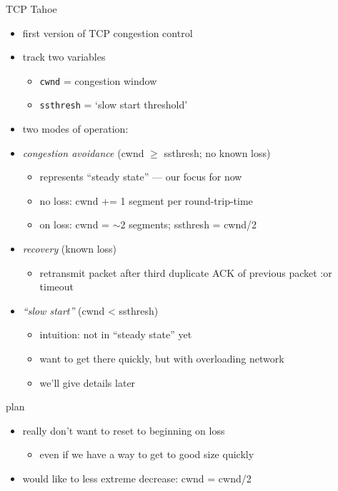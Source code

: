 \begin{frame}{TCP Tahoe}
    \begin{itemize}
    \item first version of TCP congestion control
    \item track two variables
        \begin{itemize}
        \item \texttt{cwnd} = congestion window
        \item \texttt{ssthresh} = `slow start threshold'
        \end{itemize}
    \item two modes of operation:
    \item \textit{congestion avoidance} (cwnd $\ge$ ssthresh; no known loss)
        \begin{itemize}
        \item represents ``steady state'' --- our focus for now
        \item no loss: cwnd += 1 segment per round-trip-time
        \item on loss: cwnd = $\sim$2 segments; ssthresh = cwnd/2
        \end{itemize}
    \item \textit{recovery} (known loss)
        \begin{itemize}
        \item retransmit packet after third duplicate ACK of previous packet :or timeout
        \end{itemize}
    \item \textit{``slow start''} (cwnd < ssthresh)
        \begin{itemize}
        \item intuition: not in ``steady state'' yet
        \item want to get there  quickly, but with overloading network
        \item we'll give details later
        \end{itemize}
    \end{itemize}
\end{frame}

\begin{frame}{plan}
    \begin{itemize}
    \item really don't want to reset to beginning on loss
        \begin{itemize}
        \item even if we have a way to get to good size quickly
        \end{itemize}
    \item would like to less extreme decrease: cwnd = cwnd/2
    \end{itemize}
\end{frame}
